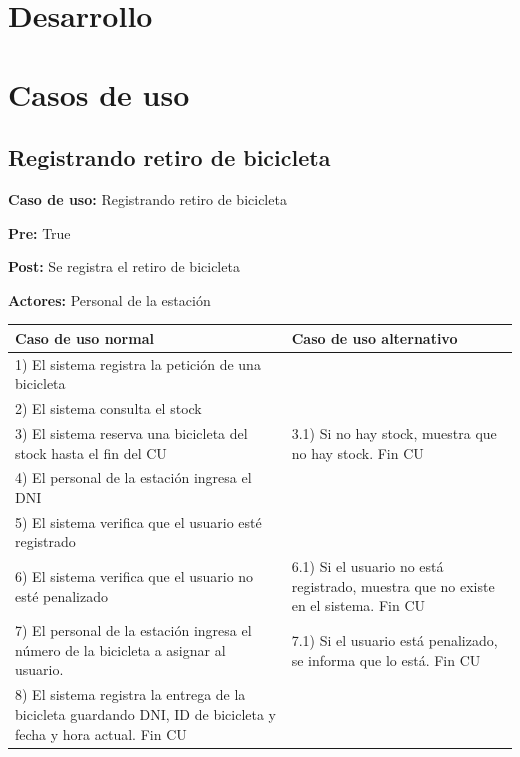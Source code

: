 \documentclass[a4paper, 10pt, twoside]{article}
\begin{document}


\section{Desarrollo}




\section{Casos de uso}

\subsection{Registrando retiro de bicicleta}

\textbf{Caso de uso:} Registrando retiro de bicicleta

\textbf{Pre:} True

\textbf{Post:} Se registra el retiro de bicicleta

\textbf{Actores:} Personal de la estación
\\

\begin{tabular}{| p{7cm} | p{7cm} |}
	\hline
	Caso de uso normal & Caso de uso alternativo \\ \hline
	1) El sistema registra la petición de una bicicleta &  \\ \hline
	2) El sistema consulta el stock & \\ \hline
	3) El sistema reserva una bicicleta del stock hasta el fin del CU & 3.1) Si no hay stock, muestra que no hay stock. Fin CU \\ \hline
	4) El personal de la estación ingresa el DNI & \\ \hline
	5) El sistema verifica que el usuario esté registrado & \\ \hline
	6) El sistema verifica que el usuario no esté penalizado & 6.1) Si el usuario no está registrado, muestra que no existe en el sistema. Fin CU \\ \hline
	7) El personal de la estación ingresa el número de la bicicleta a asignar al usuario. & 7.1) Si el usuario está penalizado, se informa que lo está. Fin CU \\ \hline
	8) El sistema registra la entrega de la bicicleta guardando DNI, ID de bicicleta y fecha y hora actual. Fin CU & \\
	\hline
\end{tabular}
\end{document}
